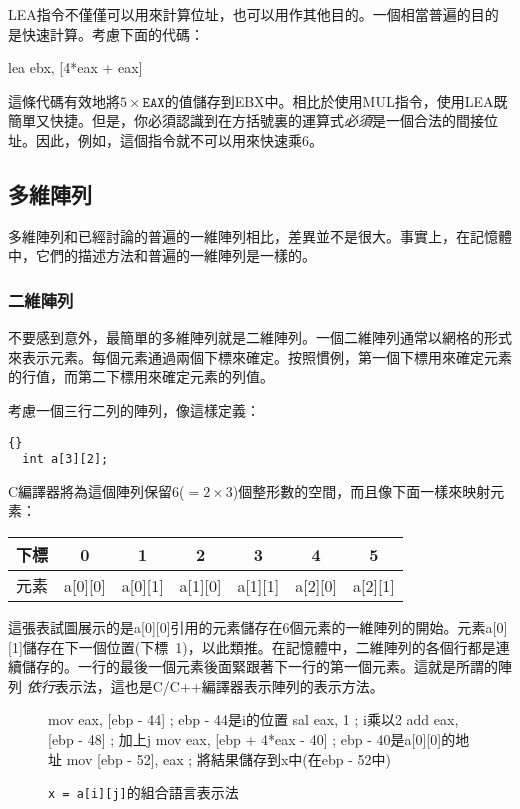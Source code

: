 {\code LEA}指令不僅僅可以用來計算位址，也可以用作其他目的。一個相當普遍的目的是快速計算。考慮下面的代碼：
\begin{AsmCodeListing}[numbers=none,frame=none]
      lea    ebx, [4*eax + eax]
\end{AsmCodeListing}
這條代碼有效地將$5 \times \mathtt{EAX}$的值儲存到EBX中。相比於使用{\code MUL}指令，使用{\code LEA}既簡單又快捷。但是，你必須認識到在方括號裏的運算式\emph{必須}是一個合法的間接位址。因此，例如，這個指令就不可以用來快速乘6。


\subsection{多維陣列}

多維陣列和已經討論的普遍的一維陣列相比，差異並不是很大。事實上，在記憶體中，它們的描述方法和普遍的一維陣列是一樣的。

\subsubsection{二維陣列}
不要感到意外，最簡單的多維陣列就是二維陣列。一個二維陣列通常以網格的形式來表示元素。每個元素通過兩個下標來確定。按照慣例，第一個下標用來確定元素的行值，而第二下標用來確定元素的列值。

考慮一個三行二列的陣列，像這樣定義：
\begin{lstlisting}[stepnumber=0]{}
  int a[3][2];
\end{lstlisting}
C編譯器將為這個陣列保留6($= 2 \times 3$)個整形數的空間，而且像下面一樣來映射元素：

\parbox{\textwidth}{
\vspace{0.5em}
\centering
\begin{tabular}{||l|c|c|c|c|c|c||}
\hline
下標 & 0 & 1 & 2 & 3 & 4 & 5 \\
\hline
元素 & a[0][0] & a[0][1] & a[1][0] & a[1][1] & a[2][0] & a[2][1]  \\
\hline
\end{tabular}
\vspace{0.5em}
}
\noindent 這張表試圖展示的是{\code a[0][0]}引用的元素儲存在6個元素的一維陣列的開始。元素{\code a[0][1]}儲存在下一個位置(下標~1)，以此類推。在記憶體中，二維陣列的各個行都是連續儲存的。一行的最後一個元素後面緊跟著下一行的第一個元素。這就是所謂的陣列
\emph{依行}表示法，這也是C/C++編譯器表示陣列的表示方法。

\begin{figure}[t]
\begin{AsmCodeListing}[]
   mov    eax, [ebp - 44]          ; ebp - 44是i的位置
   sal    eax, 1                   ; i乘以2
   add    eax, [ebp - 48]          ; 加上j
   mov    eax, [ebp + 4*eax - 40]  ; ebp - 40是a[0][0]的地址
   mov    [ebp - 52], eax          ; 將結果儲存到x中(在ebp - 52中)
\end{AsmCodeListing}
\caption{\lstinline|x = a[i][j]|的組合語言表示法 \label{fig:aij}}
\end{figure}

